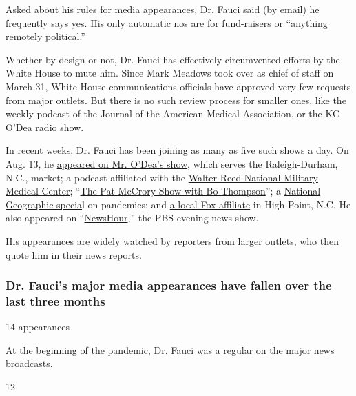 Asked about his rules for media appearances, Dr. Fauci said (by email)
he frequently says yes. His only automatic nos are for fund-raisers or
``anything remotely political.''

Whether by design or not, Dr. Fauci has effectively circumvented efforts
by the White House to mute him. Since Mark Meadows took over as chief of
staff on March 31, White House communications officials have approved
very few requests from major outlets. But there is no such review
process for smaller ones, like the weekly podcast of the Journal of the
American Medical Association, or the KC O'Dea radio show.

In recent weeks, Dr. Fauci has been joining as many as five such shows a
day. On Aug. 13, he
\href{https://www.iheart.com/podcast/53-kcodearadioprogram-28305929/episode/dr-fauci-joins-kc-odea-70194725/}{appeared
on Mr. O'Dea's show}, which serves the Raleigh-Durham, N.C., market; a
podcast affiliated with the
\href{https://www.facebookcorewwwi.onion/watch/live/?v=296749178247753\&ref=watch_permalink}{Walter
Reed National Military Medical Center};
``\href{https://wbt.radio.com/blogs/the-pat-mccrory-show-w-bo-thompson/dr-fauci-never-seen-a-virus-with-such-a-broad-range}{The
Pat McCrory Show with Bo Thompson}''; a
\href{https://stoppingpandemics.com/}{National Geographic specia}l on
pandemics; and
\href{https://myfox8.com/news/coronavirus/dr-anthony-fauci-breaks-down-what-north-carolinians-need-to-know-about-schools-vaccine-progress-in-fox8-interview/}{a
local Fox affiliate} in High Point, N.C. He also appeared on
``\href{https://www.pbs.org/newshour/show/fauci-says-despite-upcoming-election-science-will-not-be-politicized}{NewsHour},''
the PBS evening news show.

His appearances are widely watched by reporters from larger outlets, who
then quote him in their news reports.

\hypertarget{dr-faucis-major-media-appearances-have-fallen-over-the-last-three-months}{%
\subsubsection{Dr. Fauci's major media appearances have fallen over the
last three
months}\label{dr-faucis-major-media-appearances-have-fallen-over-the-last-three-months}}

14 appearances

At the beginning of the pandemic, Dr. Fauci was a regular on the major
news broadcasts.

12

